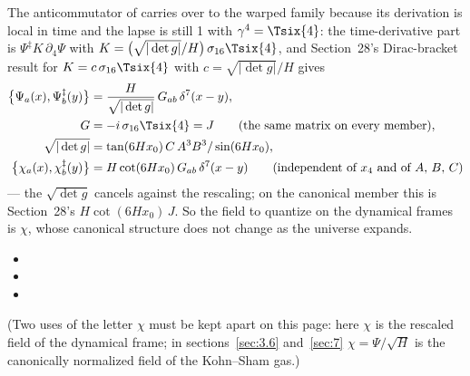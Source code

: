 The anticommutator of  carries over to the warped family because its derivation is
local in time and the lapse is still 1 with $\gamma^4=\Tsix{4}$: the time-derivative part is
$\Psi^{\ddagger}K\,\partial_4\Psi$ with $K=\bigl(\sqrt{|\det g|}/H\bigr)\,\sigma_{16}\Tsix{4}$, and
Section~28's Dirac-bracket result for $K=c\,\sigma_{16}\Tsix{4}$ with $c=\sqrt{|\det g|}/H$ gives
\begin{align*}
  \bigl\{\Psi_a(x),\Psi^{\ddagger}_b(y)\bigr\}&=\frac{H}{\sqrt{|\det g|}}\,G_{ab}\,\delta^7(x-y),\\
  G&=-i\,\sigma_{16}\Tsix{4}=J\qquad\text{(the same matrix on every member)},\\
  \sqrt{|\det g|}&=\tan(6Hx_0)\,C\,A^3B^3/\sin(6Hx_0),\\
  \bigl\{\chi_a(x),\chi^{\ddagger}_b(y)\bigr\}&=H\cot(6Hx_0)\,G_{ab}\,\delta^7(x-y)\qquad\text{(independent of $x_4$ and of $A$, $B$, $C$)}
\end{align*}
--- the $\sqrt{\det g}$ cancels against the rescaling; on the canonical member this is Section~28's
$H\cot(6Hx_0)\,J$. So the field to quantize on the dynamical frames is $\chi$, whose canonical structure
does not change as the universe expands. 
\begin{itemize}
  \item {}
  \item {}
  \item {}
\end{itemize}

(Two uses of the letter $\chi$ must be kept apart on this page: here $\chi$ is the rescaled field of the
dynamical frame; in sections~\ref{sec:3.6} and~\ref{sec:7} $\chi=\Psi/\sqrt H$ is the canonically
normalized field of the Kohn--Sham gas.)

